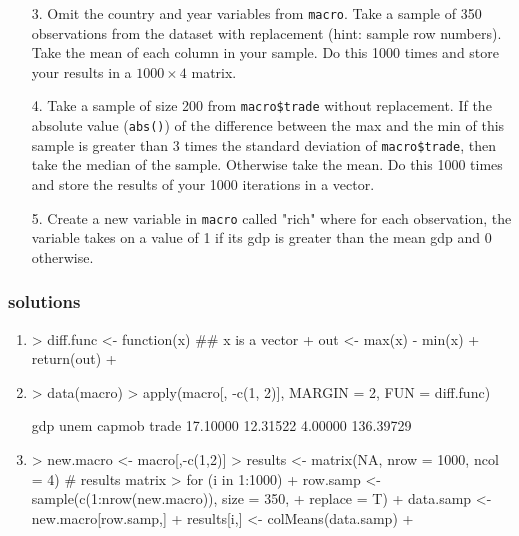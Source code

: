 \documentclass[handout]{beamer}
\newcommand{\red}{\color{red}}
\begin{document}
\begin{frame}[fragile]
\begin{enumerate}
\item[3.] Omit the country and year variables from {\tt macro}.  Take a sample of 350 observations from the dataset with replacement (hint: sample row numbers).  Take the mean of each column in your sample.  Do this 1000 times and store your results in a $1000 \times 4$ matrix.
\item[4.] Take a sample of size 200 from {\tt macro\$trade} without replacement.  If the absolute value ({\tt \red abs()}) of the difference between the max and the min of this sample is greater than 3 times the standard deviation of {\tt macro\$trade}, then take the median of the sample.  Otherwise take the mean.  Do this 1000 times and store the results of your 1000 iterations in a vector.
\item[5.] Create a new variable in {\tt macro} called "rich" where for each observation, the variable takes on a value of 1 if its gdp is greater than the mean gdp and 0 otherwise.
\end{enumerate}
\end{frame}

\begin{frame}[fragile]
\frametitle{solutions}
\begin{enumerate}
\red
\footnotesize
\item 
\begin{Schunk}
\begin{Sinput}
> diff.func <- function(x){ ## x is a vector
+   out <- max(x) - min(x)
+   return(out)
+ }
\end{Sinput}
\end{Schunk}
\medskip
\item 
\begin{Schunk}
\begin{Sinput}
> data(macro)
> apply(macro[, -c(1, 2)], MARGIN = 2, FUN = diff.func)
\end{Sinput}
\begin{Soutput}
      gdp      unem    capmob     trade 
 17.10000  12.31522   4.00000 136.39729 
\end{Soutput}
\end{Schunk}
\medskip
\item 
\begin{Schunk}
\begin{Sinput}
> new.macro <- macro[,-c(1,2)]
> results <- matrix(NA, nrow = 1000, ncol = 4) # results matrix
> for (i in 1:1000){
+   row.samp <- sample(c(1:nrow(new.macro)), size = 350, 
+   replace = T) 
+   data.samp <- new.macro[row.samp,]
+   results[i,] <- colMeans(data.samp)
+ }
\end{Sinput}
\end{Schunk}
\end{enumerate}
\end{frame}
\end{document}
